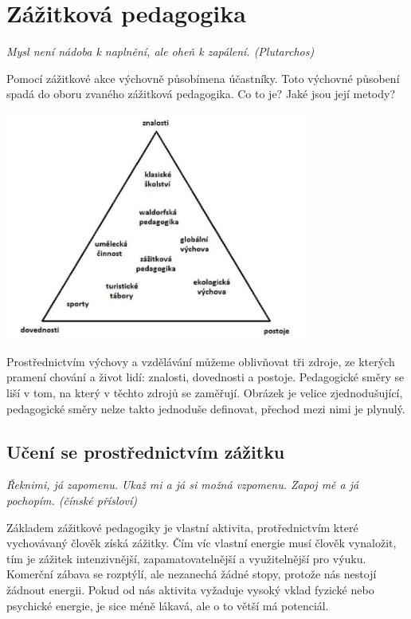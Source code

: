 \documentclass[a4paper,12pt]{report}
\begin{document}
\newpage
\section[Zážitková pedagogika]{Zážitková pedagogika}
\textit{Mysl není nádoba k naplnění, ale oheň k zapálení. (Plutarchos)}

Pomocí zážitkové akce výchovně působímena účastníky. Toto výchovné působení spadá do oboru zvaného zážitková pedagogika. Co to je? Jaké jsou její metody?

\begin{center}
\includegraphics[width=0.75\textwidth]{zdroje/pedag-zamereni.jpg}
\end{center}

Prostřednictvím výchovy a vzdělávání můžeme oblivňovat tři zdroje, ze kterých pramení chování a život lidí: znalosti, dovednosti a postoje. Pedagogické směry se liší v tom, na který v těchto zdrojů se zaměřují. Obrázek je velice zjednodušující, pedagogické směry nelze takto jednoduše definovat, přechod mezi nimi je plynulý.

\subsection*{Učení se prostřednictvím zážitku}\pagelogos
\textit{Řeknimi, já zapomenu. Ukaž mi a já si možná vzpomenu. Zapoj mě a já pochopím. (čínské přísloví)}

Základem zážitkové pedagogiky je vlastní aktivita, protřednictvím které vychovávaný člověk získá zážitky. Čím víc vlastní energie musí člověk vynaložit, tím je zážitek intenzivnější, zapamatovatelnější a využitelnější pro výuku. Komerční zábava se rozptýlí, ale nezanechá žádné stopy, protože nás nestojí žádnout energii. Pokud od nás aktivita vyžaduje vysoký vklad fyzické nebo psychické energie, je sice méně lákavá, ale o to větší má potenciál.
\end{document}
